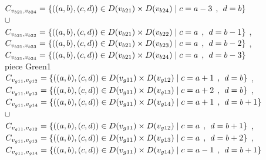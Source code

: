 \\$C_{v_{b21},v_{b24}}=\{((a,b),(c,d))\in D(v_{b21}) \times D(v_{b24})\mid c = a - 3\hspace{1ex} , \hspace{1ex}  d = b   \}$  
\\$\cup$
\\$C_{v_{b21},v_{b22}}=\{((a,b),(c,d))\in D(v_{b21}) \times D(v_{b22})\mid c = a   \hspace{1ex} , \hspace{1ex}  d = b - 1 \}$ , 
\\$C_{v_{b21},v_{b23}}=\{((a,b),(c,d))\in D(v_{b21}) \times D(v_{b23})\mid c = a   \hspace{1ex} , \hspace{1ex}  d = b - 2 \}$ , 
\\$C_{v_{b21},v_{b24}}=\{((a,b),(c,d))\in D(v_{b21}) \times D(v_{b24})\mid c = a   \hspace{1ex} , \hspace{1ex}  d = b - 3 \}$  
\\ piece Green1 
\\$C_{v_{g11},v_{g12}}=\{((a,b),(c,d))\in D(v_{g11}) \times D(v_{g12})\mid c = a + 1\hspace{1ex} , \hspace{1ex}  d = b    \}$ , 
\\$C_{v_{g11},v_{g13}}=\{((a,b),(c,d))\in D(v_{g11}) \times D(v_{g13})\mid c = a + 2\hspace{1ex} , \hspace{1ex}  d = b    \}$ , 
\\$C_{v_{g11},v_{g14}}=\{((a,b),(c,d))\in D(v_{g11}) \times D(v_{g14})\mid c = a + 1\hspace{1ex} , \hspace{1ex}  d = b + 1 \}$  
\\$\cup$
\\$C_{v_{g11},v_{g12}}=\{((a,b),(c,d))\in D(v_{g11}) \times D(v_{g12})\mid c = a  \hspace{1ex} , \hspace{1ex}  d = b + 1 \}$ , 
\\$C_{v_{g11},v_{g13}}=\{((a,b),(c,d))\in D(v_{g11}) \times D(v_{g13})\mid c = a  \hspace{1ex} , \hspace{1ex}  d = b + 2 \}$ , 
\\$C_{v_{g11},v_{g14}}=\{((a,b),(c,d))\in D(v_{g11}) \times D(v_{g14})\mid c = a - 1\hspace{1ex} , \hspace{1ex}  d = b + 1 \}$  
